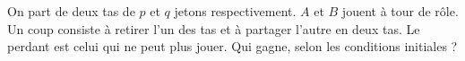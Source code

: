 On part de deux tas de $p$ et $q$ jetons respectivement. $A$ et $B$ jouent à tour de rôle. Un coup consiste à retirer l'un des tas et à partager l'autre en deux tas. Le perdant est celui qui ne peut plus jouer. Qui gagne, selon les conditions initiales ?
